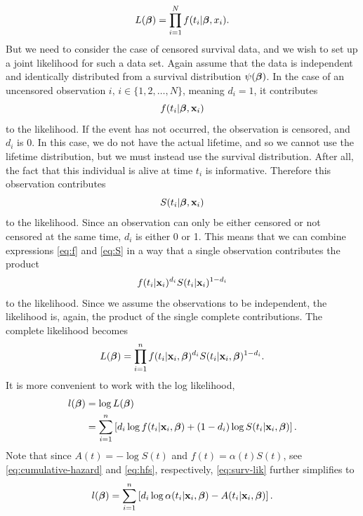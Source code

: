 \begin{equation}
    L(\boldsymbol{\beta})=\prod_{i=1}^N f(t_i|\boldsymbol{\beta},x_i).
\end{equation}
But we need to consider the case of censored survival data, and we wish to set up a joint likelihood for such a data set.
Again assume that the data is independent and identically distributed from a survival distribution $\psi(\boldsymbol{\beta})$.
In the case of an uncensored observation $i,\,i\in\{1,2,\ldots,N\}$, meaning $d_i=1$, it contributes
\begin{equation}\label{eq:f}
    f(t_i|\boldsymbol{\beta},\mathbf{x}_{i})
\end{equation}
to the likelihood. If the event has not occurred, the observation is censored, and $d_i$ is 0. In this case, we do not have the actual lifetime, and so we cannot use the lifetime distribution, but we must instead use the survival distribution.
After all, the fact that this individual is alive at time $t_i$ is informative.
Therefore this observation contributes
\begin{equation}\label{eq:S}
    S(t_i|\boldsymbol{\beta},\mathbf{x}_{i})
\end{equation}
to the likelihood. Since an observation can only be either censored or not censored at the same time, $d_i$ is either 0 or 1. This means that we can combine expressions \eqref{eq:f} and \eqref{eq:S} in a way that a single observation contributes the product
\begin{equation*}
    f(t_{i}|\mathbf{x}_i)^{d_i}S(t_{i}|\mathbf{x}_i)^{1-d_i}
\end{equation*}
to the likelihood. Since we assume the observations to be independent, the likelihood is, again, the product of the single complete contributions. The complete likelihood becomes
\begin{equation}\label{eq:surv-lik}
    L(\boldsymbol{\beta})=\prod_{i=1}^n f(t_i|\mathbf{x}_i,\boldsymbol{\beta})^{d_i} S(t_i|\mathbf{x}_i,\boldsymbol{\beta})^{1-d_i}.
\end{equation}
It is more convenient to work with the log likelihood,
\begin{align}\label{eq:surv-lik}
\begin{split}
    l(\boldsymbol{\beta})&=\log L(\boldsymbol{\beta}) \\
    &=\sum_{i=1}^n\left[ d_i \log f(t_i|\mathbf{x}_i,\boldsymbol{\beta}) + (1-d_i)\log S(t_i|\mathbf{x}_i,\boldsymbol{\beta})\right].
\end{split}
\end{align}
Note that since $A(t)=-\log S(t)$ and $f(t)=\alpha(t)S(t)$, see \eqref{eq:cumulative-hazard} and \eqref{eq:hfs}, respectively, \eqref{eq:surv-lik} further simplifies to
\begin{equation*}
    l(\boldsymbol{\beta})=\sum_{i=1}^n\left[ d_i \log \alpha(t_i|\mathbf{x}_i,\boldsymbol{\beta}) - A(t_i|\mathbf{x}_i,\boldsymbol{\beta})\right].
\end{equation*}

